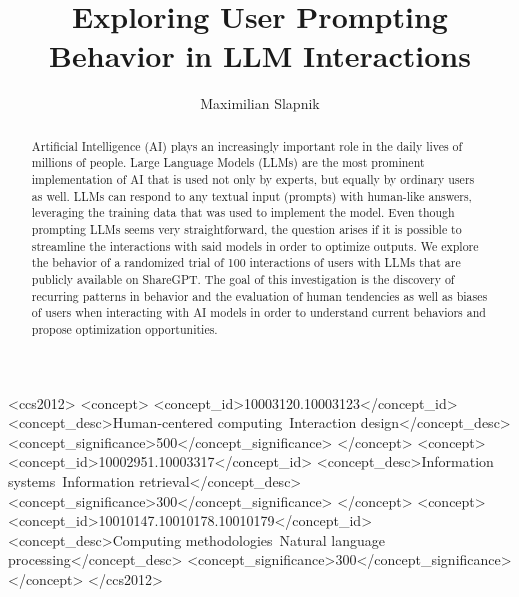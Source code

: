 \documentclass[sigconf]{acmart}
\begin{document}
\title[Prompting Behavior in LLM Interactions]{Exploring User Prompting Behavior in LLM Interactions}

\author{Maximilian Slapnik}


\begin{abstract}
  Artificial Intelligence (AI) plays an increasingly important role in the daily lives of millions of people.
  Large Language Models (LLMs) are the most prominent implementation of AI that is used not only by experts, but equally by ordinary users as well.
  LLMs can respond to any textual input (prompts) with human-like answers, leveraging the training data that was used to implement the model.
  Even though prompting LLMs seems very straightforward, the question arises if it is possible to streamline the interactions with said models in order to optimize outputs.
  We explore the behavior of a randomized trial of 100 interactions of users with LLMs that are publicly available on ShareGPT\@.
  The goal of this investigation is the discovery of recurring patterns in behavior and the evaluation of human tendencies as well as biases of users when interacting with AI models in order to understand current behaviors and propose optimization opportunities.
\end{abstract}



\begin{CCSXML}
  <ccs2012>
  <concept>
  <concept_id>10003120.10003123</concept_id>
  <concept_desc>Human-centered computing~Interaction design</concept_desc>
  <concept_significance>500</concept_significance>
  </concept>
  <concept>
  <concept_id>10002951.10003317</concept_id>
  <concept_desc>Information systems~Information retrieval</concept_desc>
  <concept_significance>300</concept_significance>
  </concept>
  <concept>
  <concept_id>10010147.10010178.10010179</concept_id>
  <concept_desc>Computing methodologies~Natural language processing</concept_desc>
  <concept_significance>300</concept_significance>
  </concept>
  </ccs2012>
\end{CCSXML}

\end{document}

